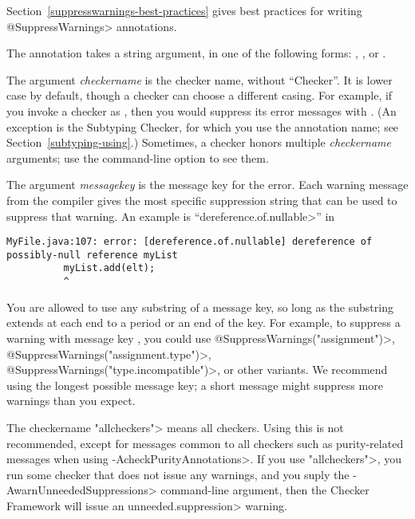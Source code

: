 Section~\ref{suppresswarnings-best-practices} gives best practices for
writing \<@SuppressWarnings> annotations.



The  annotation takes a string argument, in one of
the following forms:
,
,
or
.

The argument \emph{checkername} is the checker name, without ``Checker''.
It is lower case by default, though a checker can choose a different casing.
For
example, if you invoke a checker as
,
then you would suppress its error messages with
.  (An exception is the Subtyping
Checker, for which you use the annotation name; see
Section~\ref{subtyping-using}.)
Sometimes, a checker honors multiple \emph{checkername} arguments; use
the  command-line option to see them.

The argument \emph{messagekey} is the message key for the error.
Each warning message from the compiler gives the most specific
suppression string that can be used to suppress that warning.
An example is ``\<dereference.of.nullable>'' in

\begin{smaller}
\begin{Verbatim}
MyFile.java:107: error: [dereference.of.nullable] dereference of possibly-null reference myList
          myList.add(elt);
          ^
\end{Verbatim}
\end{smaller}

\noindent
You are allowed to use any substring of a message key, so long as the
substring extends at each end to a period or an end of the key.  For
example, to suppress a warning with message key
, you could use
\<@SuppressWarnings("assignment")>,
\<@SuppressWarnings("assignment.type")>,
\<@SuppressWarnings("type.incompatible")>, or other variants.
We recommend using
the longest possible message key; a short message might suppress more
warnings than you expect.

The checkername \<"allcheckers"> means all checkers.  Using this is not
recommended, except for messages common to all checkers such as
purity-related messages when using \<-AcheckPurityAnnotations>.  If you use
\<"allcheckers">, you run some checker that does not issue any warnings,
and you suply the \<-AwarnUnneededSuppressions> command-line argument, then
the Checker Framework will issue an \<unneeded.suppression>
warning.

